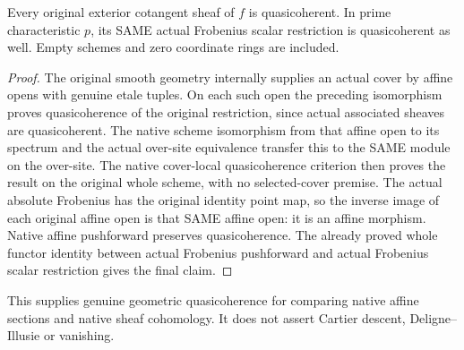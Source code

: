\begin{theorem}
\label{thm:smooth-original-exterior-quasicoherent}
\leanok
{}
Every original exterior cotangent sheaf of $f$ is quasicoherent.
In prime characteristic $p$, its SAME actual Frobenius scalar
restriction is quasicoherent as well. Empty schemes and zero
coordinate rings are included.
\end{theorem}
\begin{proof}
The original smooth geometry internally supplies an actual
cover by affine opens with genuine etale tuples. On each such
open the preceding isomorphism proves quasicoherence of the
original restriction, since actual associated sheaves are
quasicoherent. The native scheme isomorphism from that affine
open to its spectrum and the actual over-site equivalence
transfer this to the SAME module on the over-site. The native
cover-local quasicoherence criterion then proves the result
on the original whole scheme, with no selected-cover premise.
The actual absolute Frobenius has the original identity point
map, so the inverse image of each original affine open is
that SAME affine open: it is an affine morphism. Native affine
pushforward preserves quasicoherence. The already proved
whole functor identity between actual Frobenius pushforward
and actual Frobenius scalar restriction gives the final claim.
\end{proof}

This supplies genuine geometric quasicoherence for comparing
native affine sections and native sheaf cohomology. It does
not assert Cartier descent, Deligne--Illusie or vanishing.

